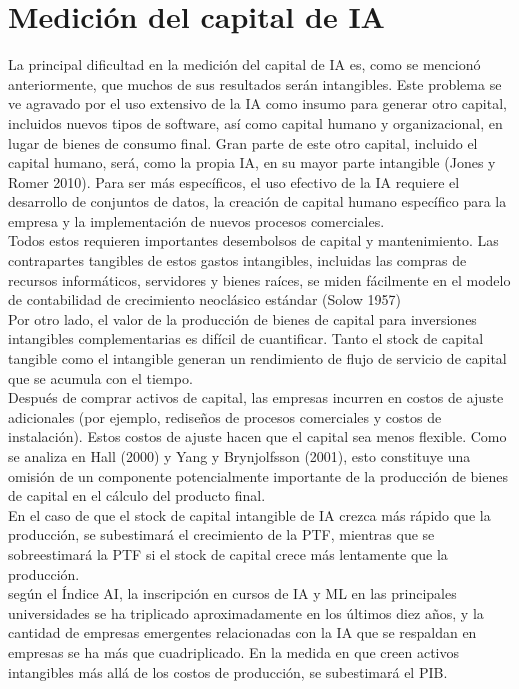 \section{Medición del capital de IA}
La principal dificultad en la medición del capital de IA es, como se mencionó anteriormente, que muchos de sus resultados serán intangibles. Este problema se ve agravado por el uso extensivo de la IA como insumo para generar otro capital, incluidos nuevos tipos de software, así como capital humano y organizacional, en lugar de bienes de consumo final. Gran parte de este otro capital, incluido el capital humano, será, como la propia IA, en su mayor parte intangible (Jones y Romer 2010). Para ser más específicos, el uso efectivo de la IA requiere el desarrollo de conjuntos de datos, la creación de capital humano específico para la empresa y la implementación de nuevos procesos comerciales.\\
Todos estos requieren importantes desembolsos de capital y mantenimiento. Las contrapartes tangibles de estos gastos intangibles, incluidas las compras de recursos informáticos, servidores y bienes raíces, se miden fácilmente en el modelo de contabilidad de crecimiento neoclásico estándar (Solow 1957)\\
Por otro lado, el valor de la producción de bienes de capital para inversiones intangibles complementarias es difícil de cuantificar. Tanto el stock de capital tangible como el intangible generan un rendimiento de flujo de servicio de capital que se acumula con el tiempo.\\
Después de comprar activos de capital, las empresas incurren en costos de ajuste adicionales (por ejemplo, rediseños de procesos comerciales y costos de instalación). Estos costos de ajuste hacen que el capital sea menos flexible.
 Como se analiza en Hall (2000) y Yang y Brynjolfsson (2001), esto constituye una omisión de un componente potencialmente importante de la producción de bienes de capital en el cálculo del producto final.\\
  En el caso de que el stock de capital intangible de IA crezca más rápido que la producción, se subestimará el crecimiento de la PTF, mientras que se sobreestimará la PTF si el stock de capital crece más lentamente que la producción.\\
   según el
Índice AI, la inscripción en cursos de IA y ML en las principales universidades se ha triplicado aproximadamente en los últimos diez años, y la cantidad de empresas emergentes relacionadas con la IA que se respaldan en empresas se ha más que cuadriplicado. En la medida en que creen activos intangibles más allá de los costos de producción, se subestimará el PIB.\\
